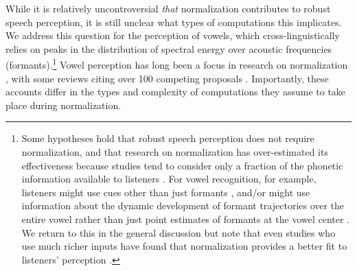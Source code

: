 \documentclass[preprint]{JASA}
\begin{document}
While it is relatively uncontroversial \emph{that} normalization contributes to robust speech perception, it is still unclear what types of computations this implicates. We address this question for the perception of vowels, which cross-linguistically relies on peaks in the distribution of spectral energy over acoustic frequencies (formants).\footnote{Some hypotheses hold that robust speech perception does not require normalization, and that research on normalization has over-estimated its effectiveness because studies tend to consider only a fraction of the phonetic information available to listeners \citep[for review, see][]{strange-jenkins2012}. For vowel recognition, for example, listeners might use cues other than just formants \citep{hillenbrand2006, nearey-assmann1986}, and/or might use information about the dynamic development of formant trajectories over the entire vowel rather than just point estimates of formants at the vowel center \citep[e.g.,][]{shankweiler1978}. We return to this in the general discussion but note that even studies who use much richer inputs have found that normalization provides a better fit to listeners' perception \citep{richter2017}.} Vowel perception has long been a focus in research on normalization \citetext{\citealp[e.g.,][]{bladon1984}; \citealp{fant1975}; \citealp{gerstman1968}; \citealp{johnson2020}; \citealp{joos1948}; \citealp{lobanov1971}; \citealp{miller1989}; \citealp{nearey1978}; \citealp{nordstrom-lindblom1975}; \citealp{syrdal-gopal1986}; \citealp{traunmuller1981}; \citealp{watt-fabricius2002}; \citealp{zahorian-jagharghi1991}; \citealp[for review, see][]{barreda2020}}, with some reviews citing over 100 competing proposals \citep{carpenter-govindarajan1993}. Importantly, these accounts differ in the types and complexity of computations they assume to take place during normalization.
\end{document}
